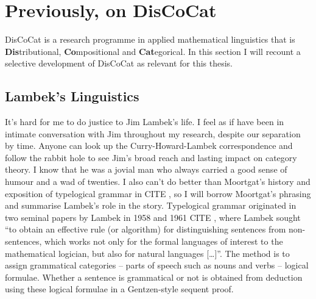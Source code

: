 \section{Previously, on DisCoCat}

DisCoCat is a research programme in applied mathematical linguistics that is \textbf{Dis}tributional, \textbf{Co}mpositional and \textbf{Cat}egorical. In this section I will recount a selective development of DisCoCat as relevant for this thesis.

\subsection{Lambek's Linguistics}

It's hard for me to do justice to Jim Lambek's life. I feel as if have been in intimate conversation with Jim throughout my research, despite our separation by time. Anyone can look up the Curry-Howard-Lambek correspondence and follow the rabbit hole to see Jim's broad reach and lasting impact on category theory. I know that he was a jovial man who always carried a good sense of humour and a wad of twenties. I also can't do better than Moortgat's history and exposition of typelogical grammar in \bR CITE \e, so I will borrow Moortgat's phrasing and summarise Lambek's role in the story. Typelogical grammar originated in two seminal papers by Lambek in 1958 and 1961 \bR CITE \e, where Lambek sought “to obtain an effective rule (or algorithm) for distinguishing sentences from non-sentences, which works not only for the formal languages of interest to the mathematical logician, but also for natural languages […]”. The method is to assign grammatical categories -- parts of speech such as nouns and verbs -- logical formulae. Whether a sentence is grammatical or not is obtained from deduction using these logical formulae in a Gentzen-style sequent proof.

